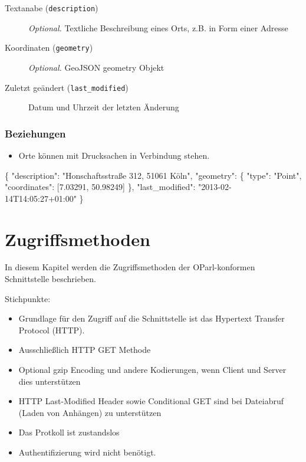 \documentclass[,a4paper]{article}
\newenvironment{Shaded}{}{}
\newcommand{\DataTypeTok}[1]{\textcolor[rgb]{0.56,0.13,0.00}{{#1}}}
\newcommand{\FloatTok}[1]{\textcolor[rgb]{0.25,0.63,0.44}{{#1}}}
\newcommand{\StringTok}[1]{\textcolor[rgb]{0.25,0.44,0.63}{{#1}}}
\newcommand{\NormalTok}[1]{{#1}}
\begin{document}
\begin{description}
\item[Textanabe (\texttt{description})]
\emph{Optional.} Textliche Beschreibung eines Orts, z.B. in Form einer
Adresse
\item[Koordinaten (\texttt{geometry})]
\emph{Optional.} GeoJSON geometry Objekt
\item[Zuletzt geändert (\texttt{last\_modified})]
Datum und Uhrzeit der letzten Änderung
\end{description}

\subsubsection{Beziehungen}

\begin{itemize}
\item
  Orte können mit Drucksachen in Verbindung stehen.
\end{itemize}

\begin{Shaded}
\begin{Highlighting}[]
\NormalTok{\{}
    \DataTypeTok{"description"}\NormalTok{: }\StringTok{"Honschaftsstraße 312, 51061 Köln"}\NormalTok{,}
    \DataTypeTok{"geometry"}\NormalTok{: \{}
        \DataTypeTok{"type"}\NormalTok{: }\StringTok{"Point"}\NormalTok{,}
        \DataTypeTok{"coordinates"}\NormalTok{: [}\FloatTok{7.03291}\NormalTok{, }\FloatTok{50.98249}\NormalTok{]}
    \NormalTok{\},}
    \DataTypeTok{"last_modified"}\NormalTok{: }\StringTok{"2013-02-14T14:05:27+01:00"}
\NormalTok{\}}
\end{Highlighting}
\end{Shaded}

\section{Zugriffsmethoden}

In diesem Kapitel werden die Zugriffsmethoden der OParl-konformen
Schnittstelle beschrieben.

Stichpunkte:

\begin{itemize}
\item
  Grundlage für den Zugriff auf die Schnittstelle ist das Hypertext
  Transfer Protocol (HTTP).
\item
  Ausschließlich HTTP GET Methode
\item
  Optional gzip Encoding und andere Kodierungen, wenn Client und Server
  dies unterstützen
\item
  HTTP Last-Modified Header sowie Conditional GET sind bei Dateiabruf
  (Laden von Anhängen) zu unterstützen
\item
  Das Protkoll ist zustandslos
\item
  Authentifizierung wird nicht benötigt.
\end{itemize}
\end{document}
